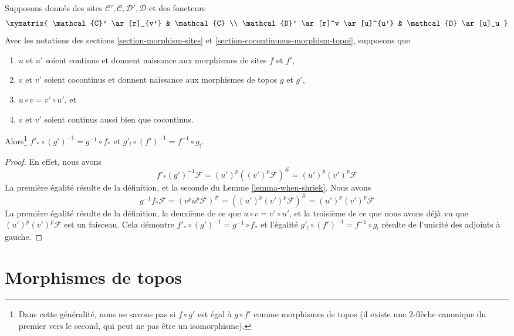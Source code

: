 \begin{lemma}
\label{lemma-special-square-continuous}
Supposons donnés des sites $\mathcal{C}', \mathcal{C}, \mathcal{D}', \mathcal{D}$
et des foncteurs
$$
\xymatrix{
\mathcal{C}' \ar[r]_{v'} &
\mathcal{C} \\
\mathcal{D}' \ar[r]^v \ar[u]^{u'} &
\mathcal{D} \ar[u]_u
}
$$
Avec les notations des sections \ref{section-morphism-sites}
et \ref{section-cocontinuous-morphism-topoi}, supposons que
\begin{enumerate}
\item $u$ et $u'$ soient continus et donnent naissance aux morphismes de
sites $f$ et $f'$,
\item $v$ et $v'$ soient cocontinus et donnent naissance aux morphismes
de topos $g$ et $g'$,
\item $u \circ v = v' \circ u'$, et
\item $v$ et $v'$ soient continus aussi bien que cocontinus.
\end{enumerate}
Alors\footnote{Dans cette généralité,
nous ne savons pas si $f \circ g'$ est égal à $g \circ f'$
comme morphismes de topos (il existe une $2$-flèche canonique du
premier vers le second, qui peut ne pas être un isomorphisme).}
$f'_* \circ (g')^{-1} = g^{-1} \circ f_*$ et
$g'_! \circ (f')^{-1} = f^{-1} \circ g_!$.
\end{lemma}

\begin{proof}
En effet, nous avons
$$
f'_*(g')^{-1}\mathcal{F} = (u')^p((v')^p\mathcal{F})^\# =
(u')^p(v')^p\mathcal{F}
$$
La première égalité résulte de la définition, et la
seconde du Lemme \ref{lemma-when-shriek}. Nous avons
$$
g^{-1}f_*\mathcal{F} = (v^pu^p\mathcal{F})^\# =
((u')^p(v')^p\mathcal{F})^\# = (u')^p(v')^p\mathcal{F}
$$
La première égalité résulte de la définition, la deuxième de ce que
$u \circ v = v' \circ u'$, et la troisième de ce que nous avons déjà vu que
$(u')^p(v')^p\mathcal{F}$ est un faisceau. Cela démontre
$f'_* \circ (g')^{-1} = g^{-1} \circ f_*$ et l’égalité
$g'_! \circ (f')^{-1} = f^{-1} \circ g_!$ résulte de
l’unicité des adjoints à gauche.
\end{proof}
















\section{Morphismes de topos}
\label{section-morphisms-topoi}

